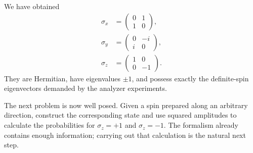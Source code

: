 \begin{classroomqa}
\end{classroomqa}

We have obtained
\begin{equation}
\begin{aligned}
\sigma_x&=\begin{pmatrix}0&1\\1&0\end{pmatrix},\\[0.4em]
\sigma_y&=\begin{pmatrix}0&-i\\i&0\end{pmatrix},\\[0.4em]
\sigma_z&=\begin{pmatrix}1&0\\0&-1\end{pmatrix}.
\end{aligned}
\label{eq:pauli-triple}
\end{equation}
They are Hermitian, have eigenvalues \(\pm1\), and possess exactly the definite-spin eigenvectors demanded by the analyzer experiments.

The next problem is now well posed. Given a spin prepared along an arbitrary direction, construct the corresponding state and use squared amplitudes to calculate the probabilities for \(\sigma_z=+1\) and \(\sigma_z=-1\). The formalism already contains enough information; carrying out that calculation is the natural next step.

